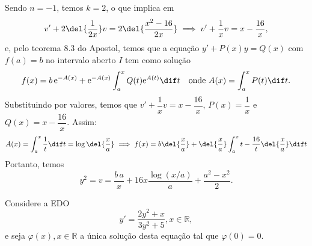 \documentclass{IMTexam}
\begin{document}
\begin{questions}
\begin{solution}
            Sendo $n=-1$, temos $k=2$, o que implica em
            \[
                v'+2\del{\dfrac{1}{2x}}v=2\del{\dfrac{x^2-16}{2x}}\implies
                v'+\dfrac{1}{x}v=x-\dfrac{16}{x},
            \]
            e, pelo teorema 8.3 do Apostol, temos que a equação $y'+P(x)y=Q(x)$
            com $f(a)=b$ no intervalo aberto $I$ tem como solução
            \[
                f(x)=b\,\mathrm{e}^{-A(x)}+\mathrm{e}^{-A(x)}
                \int_a^xQ(t)\mathrm{e}^{A(t)}\dif t\quad\text{onde }A(x)=\int_a^x P(t)\dif t.
            \]
            Substituindo por valores, temos que
            $v'+\dfrac{1}{x}v=x-\dfrac{16}{x}$, $ P(x)=\dfrac{1}{x}$ e
            $Q(x)=x-\dfrac{16}{x}$. Assim:
            \[ A(x)=\int_a^x \dfrac{1}{t}\dif t=\log\del{\dfrac{x}{a}}\implies f(x)=b\del{\dfrac{x}{a}}+\del{\dfrac{x}{a}}\int_a^x t-\dfrac{16}{t}\del{\dfrac{x}{a}}\dif t \]
            Portanto, temos
            \[ y^2=v=\dfrac{b\,a}{x}+16x\dfrac{\log (x/a)}{a}+\dfrac{a^2-x^2}{2}. \]
        \end{solution}

        \question Considere a EDO
        \[ y'=\dfrac{2y^2+x}{3y^2+5}, x\in\mathbb{R}, \]
        e seja $\varphi(x), x\in\mathbb{R}$ a única solução desta equação tal que
        $\varphi(0)=0$.

\end{questions}
\end{document}
